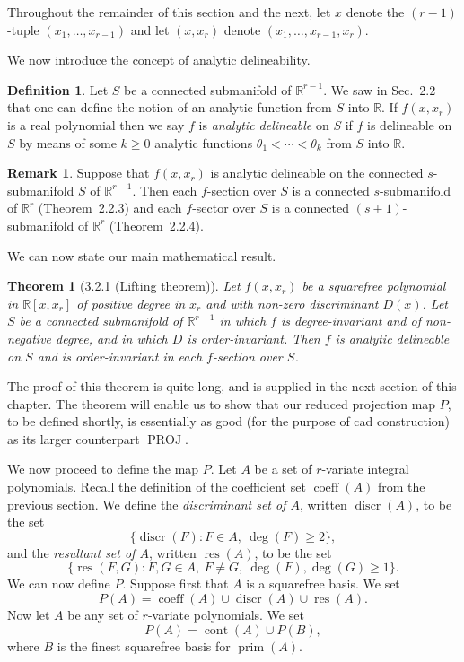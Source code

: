 \documentclass[11pt]{article}
\theoremstyle{plain}
\newtheorem*{theorem*}{Theorem}
\theoremstyle{definition}
\newtheorem*{definition}{Definition}
\newtheorem*{remark}{Remark}
\newcommand{\R}{\mathbb{R}}
\DeclareMathOperator{\res}{res}
\DeclareMathOperator{\discr}{discr}
\DeclareMathOperator{\coeff}{coeff}
\DeclareMathOperator{\cont}{cont}
\DeclareMathOperator{\prm}{prim}
\DeclareMathOperator{\PROJ}{PROJ}
\begin{document}
Throughout the remainder of this section and the next, let $x$ denote
the $(r-1)$-tuple $(x_1, \ldots, x_{r-1})$ and let $(x, x_r)$ denote
$(x_1, \ldots, x_{r-1}, x_r)$.

We now introduce the concept of analytic delineability.

\begin{definition}
Let $S$ be a connected submanifold of $\R^{r-1}$. We saw in Sec.~2.2
that one can define the notion of an analytic function from $S$ into
$\R$. If $f(x, x_r)$ is a real polynomial then we say $f$ is
\emph{analytic delineable} on $S$ if $f$ is delineable on $S$ by means
of some $k \ge 0$ analytic functions $\theta_1 < \cdots < \theta_k$
from $S$ into $\R$.
\end{definition}

\begin{remark}
Suppose that $f(x, x_r)$ is analytic delineable on the connected
$s$-submanifold $S$ of $\R^{r-1}$. Then each $f$-section over $S$ is a
connected $s$-submanifold of $\R^r$ (Theorem~2.2.3) and each $f$-sector
over $S$ is a connected $(s+1)$-submanifold of $\R^r$ (Theorem~2.2.4).
\end{remark}

We can now state our main mathematical result.

\begin{theorem*}[3.2.1 (Lifting theorem)]
Let $f(x, x_r)$ be a squarefree polynomial in $\R[x, x_r]$ of positive
degree in $x_r$ and with non-zero discriminant $D(x)$. Let $S$ be a
connected submanifold of $\R^{r-1}$ in which $f$ is degree-invariant
and of non-negative degree, and in which $D$ is order-invariant. Then
$f$ is analytic delineable on $S$ and is order-invariant in each
$f$-section over $S$.
\end{theorem*}

The proof of this theorem is quite long, and is supplied in the next
section of this chapter. The theorem will enable us to show that our
reduced projection map $P$, to be defined shortly, is essentially as
good (for the purpose of cad construction) as its larger counterpart
$\PROJ$.

We now proceed to define the map $P$. Let $A$ be a set of $r$-variate
integral polynomials. Recall the definition of the coefficient set
$\coeff(A)$ from the previous section. We define the \emph{discriminant
set of $A$}, written $\discr(A)$, to be the set
\[
\{ \discr(F) : F \in A,\ \deg(F) \ge 2 \},
\]
and the \emph{resultant set of $A$}, written $\res(A)$, to be the set
\[
\{ \res(F, G) : F, G \in A,\ F \ne G,\ \deg(F), \deg(G) \ge 1 \}.
\]
We can now define $P$. Suppose first that $A$ is a squarefree basis.
We set
\[
P(A) = \coeff(A) \cup \discr(A) \cup \res(A).
\]
Now let $A$ be any set of $r$-variate polynomials. We set
\[
P(A) = \cont(A) \cup P(B),
\]
where $B$ is the finest squarefree basis for $\prm(A)$.
\end{document}
